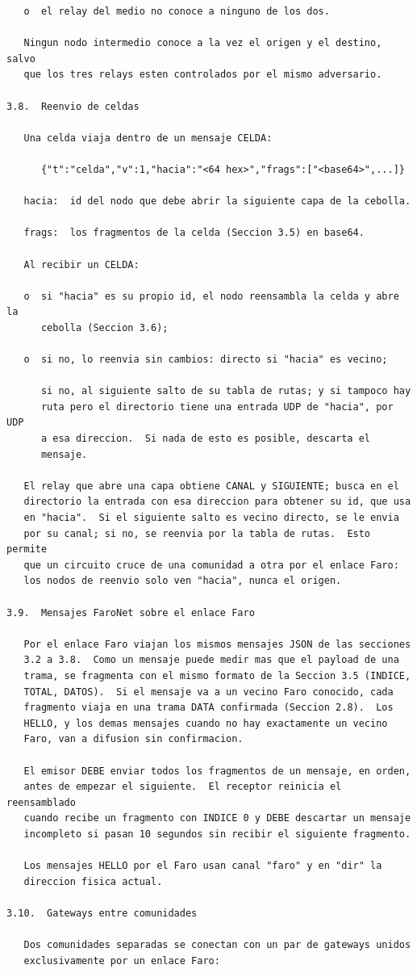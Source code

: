 \newpage
\begin{Verbatim}
   o  el relay del medio no conoce a ninguno de los dos.

   Ningun nodo intermedio conoce a la vez el origen y el destino, salvo
   que los tres relays esten controlados por el mismo adversario.

3.8.  Reenvio de celdas

   Una celda viaja dentro de un mensaje CELDA:

      {"t":"celda","v":1,"hacia":"<64 hex>","frags":["<base64>",...]}

   hacia:  id del nodo que debe abrir la siguiente capa de la cebolla.

   frags:  los fragmentos de la celda (Seccion 3.5) en base64.

   Al recibir un CELDA:

   o  si "hacia" es su propio id, el nodo reensambla la celda y abre la
      cebolla (Seccion 3.6);

   o  si no, lo reenvia sin cambios: directo si "hacia" es vecino;

      si no, al siguiente salto de su tabla de rutas; y si tampoco hay
      ruta pero el directorio tiene una entrada UDP de "hacia", por UDP
      a esa direccion.  Si nada de esto es posible, descarta el
      mensaje.

   El relay que abre una capa obtiene CANAL y SIGUIENTE; busca en el
   directorio la entrada con esa direccion para obtener su id, que usa
   en "hacia".  Si el siguiente salto es vecino directo, se le envia
   por su canal; si no, se reenvia por la tabla de rutas.  Esto permite
   que un circuito cruce de una comunidad a otra por el enlace Faro:
   los nodos de reenvio solo ven "hacia", nunca el origen.

3.9.  Mensajes FaroNet sobre el enlace Faro

   Por el enlace Faro viajan los mismos mensajes JSON de las secciones
   3.2 a 3.8.  Como un mensaje puede medir mas que el payload de una
   trama, se fragmenta con el mismo formato de la Seccion 3.5 (INDICE,
   TOTAL, DATOS).  Si el mensaje va a un vecino Faro conocido, cada
   fragmento viaja en una trama DATA confirmada (Seccion 2.8).  Los
   HELLO, y los demas mensajes cuando no hay exactamente un vecino
   Faro, van a difusion sin confirmacion.

   El emisor DEBE enviar todos los fragmentos de un mensaje, en orden,
   antes de empezar el siguiente.  El receptor reinicia el reensamblado
   cuando recibe un fragmento con INDICE 0 y DEBE descartar un mensaje
   incompleto si pasan 10 segundos sin recibir el siguiente fragmento.

   Los mensajes HELLO por el Faro usan canal "faro" y en "dir" la
   direccion fisica actual.

3.10.  Gateways entre comunidades

   Dos comunidades separadas se conectan con un par de gateways unidos
   exclusivamente por un enlace Faro:
\end{Verbatim}
